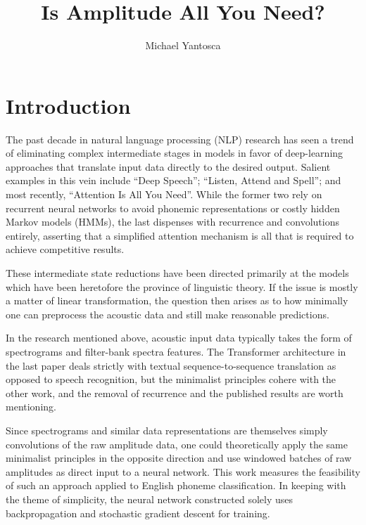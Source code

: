 \documentclass[10pt,epsf]{article}
\date{}
\title{Is Amplitude All You Need?}
\author{Michael Yantosca}
\begin{document}
\maketitle
\tableofcontents
\abstract{}{
}
\section{Introduction}{
  The past decade in natural language processing (NLP) research has seen a trend of
  eliminating complex intermediate stages in models in favor of deep-learning approaches
  that translate input data directly to the desired output. Salient examples in this vein include
  ``Deep Speech''\autocite{deepspeech}; ``Listen, Attend and Spell''\autocite{LAS};
  and most recently, ``Attention Is All You Need''\autocite{AIAYN}. While the former two
  rely on recurrent neural networks to avoid phonemic representations or costly
  hidden Markov models (HMMs), the last dispenses with recurrence and convolutions
  entirely, asserting that a simplified attention mechanism is all that is required
  to achieve competitive results.

  These intermediate state reductions have been directed primarily at the models
  which have been heretofore the province of linguistic theory. If the issue is
  mostly a matter of linear transformation, the question then arises as to how
  minimally one can preprocess the acoustic data and still make reasonable predictions.

  In the research mentioned above, acoustic input data typically takes the form of
  spectrograms\autocite[2]{deepspeech} and filter-bank spectra features\autocite[2]{LAS}.
  The Transformer architecture in the last paper deals strictly with textual sequence-to-sequence
  translation as opposed to speech recognition, but the minimalist principles cohere with
  the other work, and the removal of recurrence and the published results are worth mentioning.

  Since spectrograms and similar data representations are themselves simply convolutions
  of the raw amplitude data, one could theoretically apply the same minimalist principles in
  the opposite direction and use windowed batches of raw amplitudes as direct input to
  a neural network. This work measures the feasibility of such an approach applied to
  English phoneme classification. In keeping with the theme of simplicity, the neural
  network constructed solely uses backpropagation and stochastic gradient descent for training.
}
\end{document}
